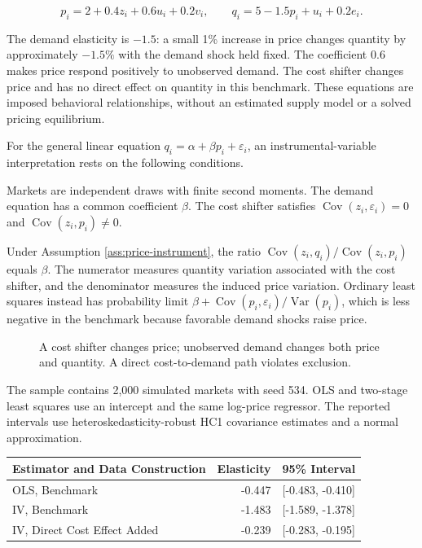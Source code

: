 \[
p_i=2+0.4z_i+0.6u_i+0.2v_i,
\qquad
q_i=5-1.5p_i+u_i+0.2e_i.
\]

The demand elasticity is \(-1.5\): a small 1\% increase in price changes
quantity by approximately \(-1.5\%\) with the demand shock held fixed.
The coefficient \(0.6\) makes price respond positively to unobserved
demand. The cost shifter changes price and has no direct effect on
quantity in this benchmark. These equations are imposed behavioral
relationships, without an estimated supply model or a solved pricing
equilibrium.

For the general linear equation \(q_i=\alpha+\beta p_i+\varepsilon_i\),
an instrumental-variable interpretation rests on the following
conditions.

\begin{assumption}
\label{ass:price-instrument}
Markets are independent draws with finite second moments. The demand equation has a common coefficient $\beta$. The cost shifter satisfies $\operatorname{Cov}(z_i,\varepsilon_i)=0$ and $\operatorname{Cov}(z_i,p_i)\ne0$.
\end{assumption}

Under Assumption \ref{ass:price-instrument}, the ratio
\(\operatorname{Cov}(z_i,q_i)/\operatorname{Cov}(z_i,p_i)\) equals
\(\beta\). The numerator measures quantity variation associated with the
cost shifter, and the denominator measures the induced price variation.
Ordinary least squares instead has probability limit
\(\beta+\operatorname{Cov}(p_i,\varepsilon_i)/\operatorname{Var}(p_i)\),
which is less negative in the benchmark because favorable demand shocks
raise price.

\begin{figure}[htbp]
\centering

\caption{A cost shifter changes price; unobserved demand changes both price and quantity. A direct cost-to-demand path violates exclusion.}\label{fig:M03_price_instrument}
\end{figure}

The sample contains 2,000 simulated markets with seed 534. OLS and
two-stage least squares use an intercept and the same log-price
regressor. The reported intervals use heteroskedasticity-robust HC1
covariance estimates and a normal approximation.

\begin{table}[H]
\centering\small
\begin{tabular}{@{}lrl@{}}
\toprule
Estimator and Data Construction & Elasticity & 95\% Interval \\
\midrule

OLS, Benchmark & -0.447 & {[}-0.483, -0.410{]} \\
IV, Benchmark & -1.483 & {[}-1.589, -1.378{]} \\
IV, Direct Cost Effect Added & -0.239 & {[}-0.283, -0.195{]} \\
\bottomrule
\end{tabular}
\end{table}

